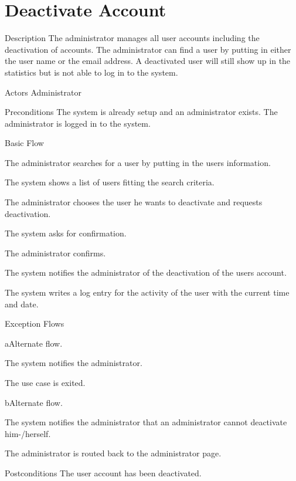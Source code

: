 \section{Deactivate Account}

%
\begin{cpart}{Description}
The administrator manages all user accounts including the deactivation of accounts. The administrator can find a user by putting in either the user name or the email address. A deactivated user will still show up in the statistics but is not able to log in to the system.
\end{cpart}


%
\begin{cpart}{Actors}
Administrator
\end{cpart}

%
\begin{cpart}{Preconditions}
The system is already setup and an administrator exists. The administrator is logged in to the system.
\end{cpart}

%
\begin{cpartList}{Basic Flow}
  \item The administrator searches for a user by putting in the users information.
  \item The system shows a list of users fitting the search criteria.
  \item The administrator chooses the user he wants to deactivate and requests deactivation.
  \item The system asks for confirmation.
  \item The administrator confirms.
  \item The system notifies the administrator of the deactivation of the users account.
    \item The system writes a log entry for the activity of the user with the current time and date.
\end{cpartList}

%
\begin{cpartList}{Exception Flows}
  \begin{innerList}{4}{a}{Alternate flow.}
    \item The system notifies the administrator.
    \item The use case is exited.
  \end{innerList}

  \begin{innerList}{4}{b}{Alternate flow.}
    \item The system notifies the administrator that an administrator cannot deactivate him-/herself.
    \item The administrator is routed back to the administrator page.
  \end{innerList}
\end{cpartList}

%
\begin{cpart}{Postconditions}
The user account has been deactivated.
\end{cpart}

\clearpage
